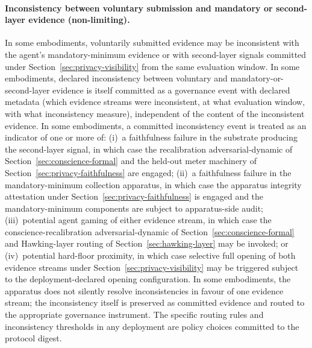 \documentclass[a4paper,12pt]{article}
\begin{document}
\paragraph{Inconsistency between voluntary submission and mandatory
or second-layer evidence (non-limiting).}
In some embodiments, voluntarily submitted evidence may be
inconsistent with the agent's mandatory-minimum evidence or with
second-layer signals committed under
Section~\ref{sec:privacy-visibility} from the same evaluation
window. In some embodiments, declared inconsistency between
voluntary and mandatory-or-second-layer evidence is itself committed
as a governance event with declared metadata (which evidence
streams were inconsistent, at what evaluation window, with what
inconsistency measure), independent of the content of the
inconsistent evidence. In some embodiments, a committed inconsistency
event is treated as an indicator of one or more of: (i)~a faithfulness
failure in the substrate producing the second-layer signal, in which
case the recalibration adversarial-dynamic of
Section~\ref{sec:conscience-formal} and the held-out meter machinery
of Section~\ref{sec:privacy-faithfulness} are engaged; (ii)~a
faithfulness failure in the mandatory-minimum collection apparatus,
in which case the apparatus integrity attestation under
Section~\ref{sec:privacy-faithfulness} is engaged and the
mandatory-minimum components are subject to apparatus-side audit;
(iii)~potential agent gaming of either evidence stream, in which
case the conscience-recalibration adversarial-dynamic of
Section~\ref{sec:conscience-formal} and Hawking-layer routing of
Section~\ref{sec:hawking-layer} may be invoked; or (iv)~potential
hard-floor proximity, in which case selective full opening of both
evidence streams under Section~\ref{sec:privacy-visibility} may be
triggered subject to the deployment-declared opening configuration.
In some embodiments, the apparatus does not silently resolve
inconsistencies in favour of one evidence stream; the inconsistency
itself is preserved as committed evidence and routed to the
appropriate governance instrument. The specific routing rules and
inconsistency thresholds in any deployment are policy choices
committed to the protocol digest.
\end{document}
